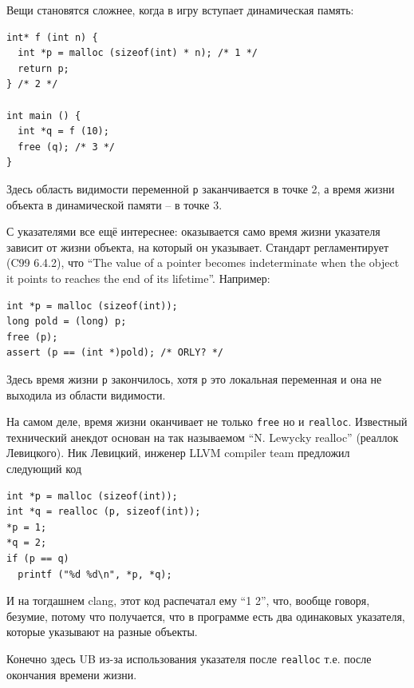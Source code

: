 \documentclass[a4paper,12pt,oneside]{book}
\newif\ifanswers
\begin{document}
\ifanswers
Правильный ответ: здесь работает ещё одна перегруженная функция ключевого слова \lstinline!static! -- оно расширяет время жизни переменной до времени жизни программы. Таким образом здесь будет все хорошо -- переменная \lstinline!z! будет жить даже между вызовами функции.
\fi

Вещи становятся сложнее, когда в игру вступает динамическая память:

\begin{lstlisting}
int* f (int n) {
  int *p = malloc (sizeof(int) * n); /* 1 */
  return p;
} /* 2 */

int main () {
  int *q = f (10); 
  free (q); /* 3 */
}
\end{lstlisting}

Здесь область видимости переменной \lstinline!p! заканчивается в точке 2, а время жизни объекта в динамической памяти -- в точке 3.

С указателями все ещё интереснее: оказывается само время жизни указателя зависит от жизни объекта, на который он указывает. Стандарт регламентирует (C99 6.4.2), что ``The value of a pointer becomes indeterminate when the object it points to reaches the end of its lifetime''. Например:

\begin{lstlisting}
int *p = malloc (sizeof(int));
long pold = (long) p;
free (p);
assert (p == (int *)pold); /* ORLY? */
\end{lstlisting}

Здесь время жизни \lstinline!p! закончилось, хотя \lstinline!p! это локальная переменная и она не выходила из области видимости.

На самом деле, время жизни оканчивает не только \lstinline!free! но и \lstinline!realloc!. Известный технический анекдот основан на так называемом ``N. Lewycky realloc'' (реаллок Левицкого). Ник Левицкий, инженер LLVM compiler team предложил следующий код

\begin{lstlisting}
int *p = malloc (sizeof(int));
int *q = realloc (p, sizeof(int));
*p = 1;
*q = 2;
if (p == q)
  printf ("%d %d\n", *p, *q);
\end{lstlisting}

И на тогдашнем clang, этот код распечатал ему ``1 2'', что, вообще говоря, безумие, потому что получается, что в программе есть два одинаковых указателя, которые указывают на разные объекты.

Конечно здесь UB из-за использования указателя после \lstinline!realloc! т.е. после окончания времени жизни.
\end{document}
